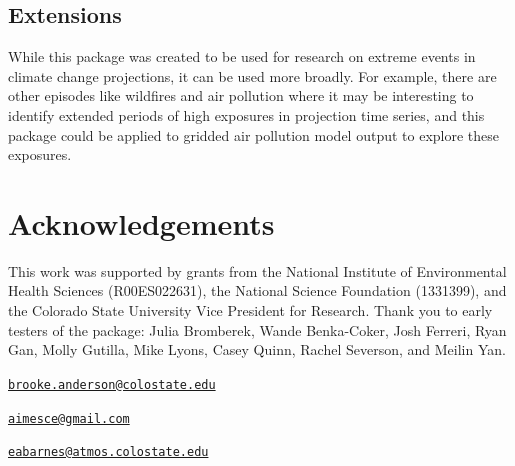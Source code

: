 \subsection{Extensions}\label{extensions}

While this package was created to be used for research on extreme events
in climate change projections, it can be used more broadly. For example,
there are other episodes like wildfires and air pollution where it may
be interesting to identify extended periods of high exposures in
projection time series, and this package could be applied to gridded air
pollution model output to explore these exposures.

\section{Acknowledgements}\label{acknowledgements}

This work was supported by grants from the National Institute of
Environmental Health Sciences (R00ES022631), the National Science
Foundation (1331399), and the Colorado State University Vice President
for Research. Thank you to early testers of the package: Julia
Bromberek, Wande Benka-Coker, Josh Ferreri, Ryan Gan, Molly Gutilla,
Mike Lyons, Casey Quinn, Rachel Severson, and Meilin Yan.



\address{%
G. Brooke Anderson\\
Colorado State University\\
Department of Environmental \& Radiological Health Sciences\\ 1681 Campus Delivery\\ Fort Collins, Colorado 80523\\
}
\href{mailto:brooke.anderson@colostate.edu}{\nolinkurl{brooke.anderson@colostate.edu}}

\address{%
Colin Eason\\
Colorado State University\\
Department of Computer Science\\ 1873 Campus Delivery\\ Fort Collins, Colorado 80523\\
}
\href{mailto:aimesce@gmail.com}{\nolinkurl{aimesce@gmail.com}}

\address{%
Elizabeth A. Barnes\\
Colorado State University\\
Department of Atmospheric Science\\ 1371 Campus Delivery\\ Fort Collins, CO 80523\\
}
\href{mailto:eabarnes@atmos.colostate.edu}{\nolinkurl{eabarnes@atmos.colostate.edu}}

